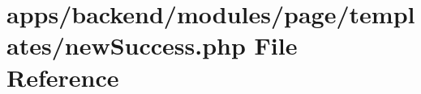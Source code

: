 \hypertarget{backend_2modules_2page_2templates_2new_success_8php}{\section{apps/backend/modules/page/templates/new\-Success.php File Reference}
\label{backend_2modules_2page_2templates_2new_success_8php}
}
